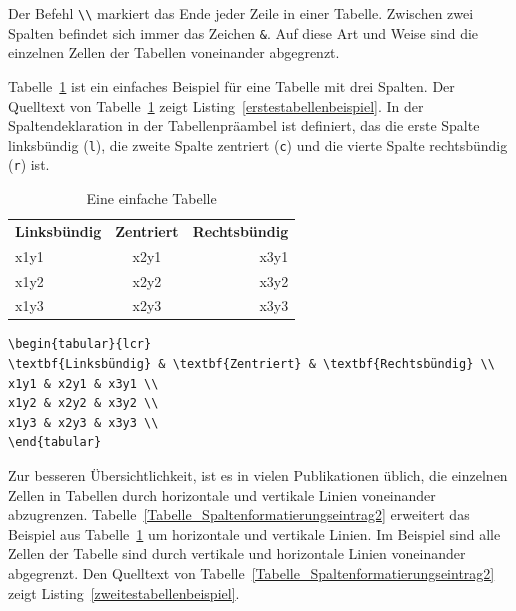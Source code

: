 \documentclass[a4paper,10pt,twoside]{scrbook}
\begin{document}
Der Befehl \verb!\\! markiert das Ende jeder Zeile in einer Tabelle.
Zwischen zwei Spalten befindet sich immer das Zeichen \verb!&!. Auf diese
Art und Weise sind die einzelnen Zellen der Tabellen voneinander abgegrenzt.

Tabelle~\ref{Tabelle_Spaltenformatierungseintrag1} ist ein einfaches Beispiel 
für eine Tabelle mit drei Spalten. Der Quelltext von Tabelle~\ref{Tabelle_Spaltenformatierungseintrag1} zeigt Listing~\ref{erstestabellenbeispiel}. In der Spaltendeklaration in der Tabellenpräambel
ist definiert, das die erste Spalte linksbündig (\verb!l!), die zweite Spalte zentriert (\verb!c!) und die vierte Spalte rechtsbündig (\verb!r!) ist.

\begin{table}[h!tb]
\centering
\caption{Eine einfache Tabelle}
\label{Tabelle_Spaltenformatierungseintrag1}
\begin{tabular}{lcr}
\textbf{Linksbündig} & \textbf{Zentriert} & \textbf{Rechtsbündig} \\
x1y1 & x2y1 & x3y1 \\
x1y2 & x2y2 & x3y2 \\
x1y3 & x2y3 & x3y3 \\
\end{tabular}
\end{table}




\begin{lstlisting}[caption={Das allererste Beispiel},label=erstestabellenbeispiel, style=customlatex]
\begin{tabular}{lcr}
\textbf{Linksbündig} & \textbf{Zentriert} & \textbf{Rechtsbündig} \\
x1y1 & x2y1 & x3y1 \\
x1y2 & x2y2 & x3y2 \\
x1y3 & x2y3 & x3y3 \\
\end{tabular}
\end{lstlisting}

Zur besseren Übersichtlichkeit, ist es in vielen Publikationen üblich, die einzelnen Zellen in Tabellen durch horizontale und vertikale Linien voneinander abzugrenzen. 
Tabelle~\ref{Tabelle_Spaltenformatierungseintrag2} erweitert das Beispiel aus Tabelle~\ref{Tabelle_Spaltenformatierungseintrag1} um horizontale und vertikale Linien. Im Beispiel sind alle Zellen der Tabelle sind durch vertikale und horizontale Linien voneinander abgegrenzt.
Den Quelltext von Tabelle~\ref{Tabelle_Spaltenformatierungseintrag2} zeigt Listing~\ref{zweitestabellenbeispiel}. 
\end{document}
